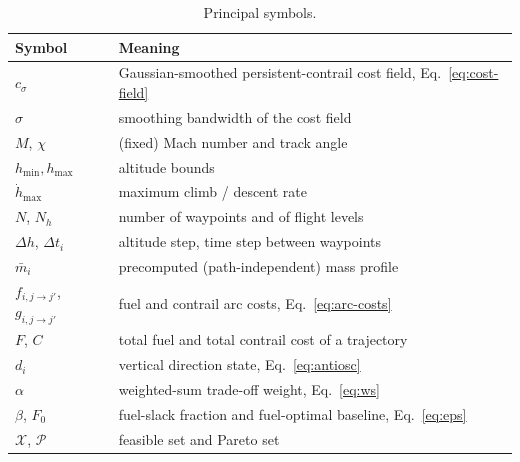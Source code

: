 \begin{table}[t]
  \centering
  \caption{Principal symbols.}
  \label{tab:symbols}
  \begin{tabular}{ll}
    \toprule
    Symbol & Meaning \\
    \midrule
    $c_\sigma$                  & Gaussian-smoothed persistent-contrail cost field, Eq.~\eqref{eq:cost-field} \\
    $\sigma$                    & smoothing bandwidth of the cost field \\
    $M$, $\chi$                 & (fixed) Mach number and track angle \\
    $h_{\min},h_{\max}$         & altitude bounds \\
    $\dot h_{\max}$             & maximum climb / descent rate \\
    $N$, $N_h$                  & number of waypoints and of flight levels \\
    $\Delta h$, $\Delta t_i$    & altitude step, time step between waypoints \\
    $\bar m_i$                  & precomputed (path-independent) mass profile \\
    $f_{i,j\to j'}$, $g_{i,j\to j'}$ & fuel and contrail arc costs, Eq.~\eqref{eq:arc-costs} \\
    $F$, $C$                    & total fuel and total contrail cost of a trajectory \\
    $d_i$                       & vertical direction state, Eq.~\eqref{eq:antiosc} \\
    $\alpha$                    & weighted-sum trade-off weight, Eq.~\eqref{eq:ws} \\
    $\beta$, $F_0$              & fuel-slack fraction and fuel-optimal baseline, Eq.~\eqref{eq:eps} \\
    $\mathcal{X}$, $\mathcal{P}$ & feasible set and Pareto set \\
    \bottomrule
  \end{tabular}
\end{table}
